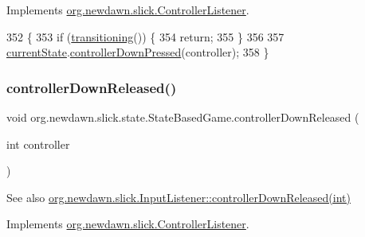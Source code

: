 Implements \mbox{\hyperlink{interfaceorg_1_1newdawn_1_1slick_1_1_controller_listener_a9c619e7cb29b3c8b68bc24f9a4e238d7}{org.\+newdawn.\+slick.\+Controller\+Listener}}.


\begin{DoxyCode}
352                                                       \{
353         \textcolor{keywordflow}{if} (\mbox{\hyperlink{classorg_1_1newdawn_1_1slick_1_1state_1_1_state_based_game_ae869c08778875776081935a090d4c92f}{transitioning}}()) \{
354             \textcolor{keywordflow}{return};
355         \}
356         
357         \mbox{\hyperlink{classorg_1_1newdawn_1_1slick_1_1state_1_1_state_based_game_a6a45e68094bb9b7ec30b8a8b7d415766}{currentState}}.\mbox{\hyperlink{interfaceorg_1_1newdawn_1_1slick_1_1_controller_listener_a9c619e7cb29b3c8b68bc24f9a4e238d7}{controllerDownPressed}}(controller);
358     \}
\end{DoxyCode}
\mbox{\label{classorg_1_1newdawn_1_1slick_1_1state_1_1_state_based_game_a510241b92e4f3670e04d240ecc5b797a}} 
\subsubsection{\texorpdfstring{controller\+Down\+Released()}{controllerDownReleased()}}
{\footnotesize\ttfamily void org.\+newdawn.\+slick.\+state.\+State\+Based\+Game.\+controller\+Down\+Released (\begin{DoxyParamCaption}\item[{int}]{controller }\end{DoxyParamCaption})\hspace{0.3cm}{\ttfamily [inline]}}

\begin{DoxySeeAlso}{See also}
\mbox{\hyperlink{interfaceorg_1_1newdawn_1_1slick_1_1_controller_listener_a7d0ca99c8cd5b0d332bece1d17befee7}{org.\+newdawn.\+slick.\+Input\+Listener\+::controller\+Down\+Released(int)}} 
\end{DoxySeeAlso}


Implements \mbox{\hyperlink{interfaceorg_1_1newdawn_1_1slick_1_1_controller_listener_a7d0ca99c8cd5b0d332bece1d17befee7}{org.\+newdawn.\+slick.\+Controller\+Listener}}.


